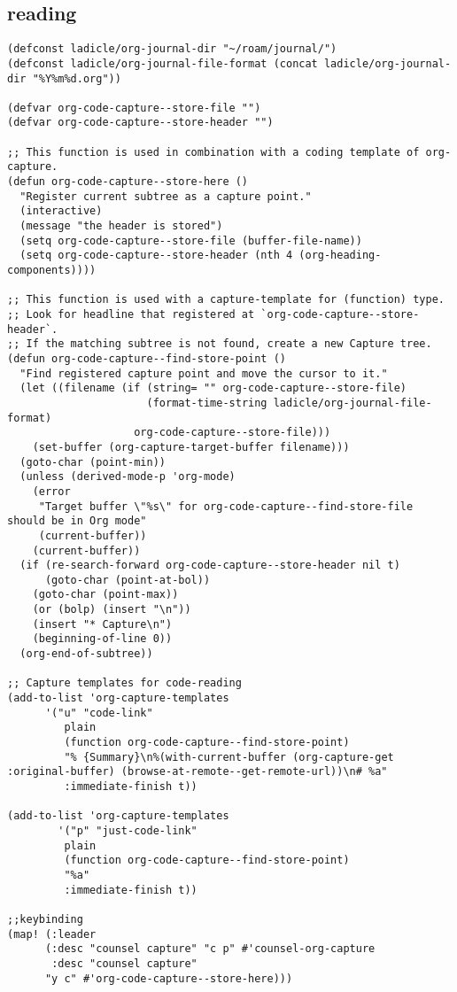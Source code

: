 \documentclass[11pt]{article}
\begin{document}
\subsection{reading}
\label{sec:org652a299}
\begin{verbatim}
(defconst ladicle/org-journal-dir "~/roam/journal/")
(defconst ladicle/org-journal-file-format (concat ladicle/org-journal-dir "%Y%m%d.org"))

(defvar org-code-capture--store-file "")
(defvar org-code-capture--store-header "")

;; This function is used in combination with a coding template of org-capture.
(defun org-code-capture--store-here ()
  "Register current subtree as a capture point."
  (interactive)
  (message "the header is stored")
  (setq org-code-capture--store-file (buffer-file-name))
  (setq org-code-capture--store-header (nth 4 (org-heading-components))))

;; This function is used with a capture-template for (function) type.
;; Look for headline that registered at `org-code-capture--store-header`.
;; If the matching subtree is not found, create a new Capture tree.
(defun org-code-capture--find-store-point ()
  "Find registered capture point and move the cursor to it."
  (let ((filename (if (string= "" org-code-capture--store-file)
                      (format-time-string ladicle/org-journal-file-format)
                    org-code-capture--store-file)))
    (set-buffer (org-capture-target-buffer filename)))
  (goto-char (point-min))
  (unless (derived-mode-p 'org-mode)
    (error
     "Target buffer \"%s\" for org-code-capture--find-store-file should be in Org mode"
     (current-buffer))
    (current-buffer))
  (if (re-search-forward org-code-capture--store-header nil t)
      (goto-char (point-at-bol))
    (goto-char (point-max))
    (or (bolp) (insert "\n"))
    (insert "* Capture\n")
    (beginning-of-line 0))
  (org-end-of-subtree))

;; Capture templates for code-reading
(add-to-list 'org-capture-templates
      '("u" "code-link"
         plain
         (function org-code-capture--find-store-point)
         "% {Summary}\n%(with-current-buffer (org-capture-get :original-buffer) (browse-at-remote--get-remote-url))\n# %a"
         :immediate-finish t))

(add-to-list 'org-capture-templates
        '("p" "just-code-link"
         plain
         (function org-code-capture--find-store-point)
         "%a"
         :immediate-finish t))

;;keybinding
(map! (:leader
      (:desc "counsel capture" "c p" #'counsel-org-capture
       :desc "counsel capture"
      "y c" #'org-code-capture--store-here)))

\end{verbatim}
\end{document}
